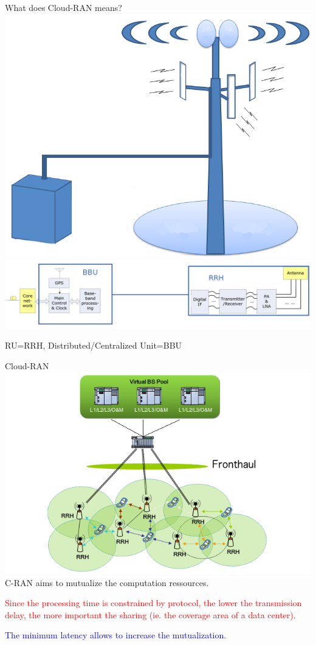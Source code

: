 \documentclass[10 pt]{beamer}
\begin{document}
\begin{frame}{What does Cloud-RAN means?}
  \centering
  \includegraphics[scale=0.2]{cloudbts.png}\\
  \includegraphics[scale=0.175]{BBURRH.png}
  
   RU=RRH, Distributed/Centralized Unit=BBU
\end{frame}



\begin{frame}{Cloud-RAN}
  \centering
  \includegraphics[scale=0.3]{CRAN}\\
  \vspace{0.5cm}
  \pause
  C-RAN aims to mutualize the computation ressources.
  
  \textcolor{red}{Since the processing time is constrained by protocol, the lower the transmission delay, the more important the sharing (ie. the coverage area of a data center).}
  
  \textcolor{blue}{The minimum latency allows to increase the mutualization.}
  
  
\end{frame}
\end{document}
